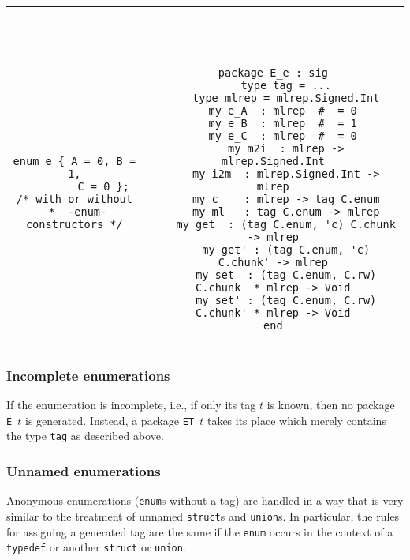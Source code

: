 \begin{small}
\begin{center}
\begin{tabular}{c|c}
\begin{minipage}{4in}
\begin{verbatim}
\end{verbatim}
\end{minipage}
\\ \hline
\begin{minipage}{2in}
\begin{verbatim}
enum e { A = 0, B = 1,
         C = 0 };
/* with or without
 *  -enum-constructors */
\end{verbatim}
\end{minipage}
&
\begin{minipage}{4in}
\begin{verbatim}

package E_e : sig
    type tag = ...
    type mlrep = mlrep.Signed.Int
    my e_A  : mlrep  #  = 0 
    my e_B  : mlrep  #  = 1 
    my e_C  : mlrep  #  = 0 
    my m2i  : mlrep -> mlrep.Signed.Int
    my i2m  : mlrep.Signed.Int -> mlrep
    my c    : mlrep -> tag C.enum
    my ml   : tag C.enum -> mlrep
    my get  : (tag C.enum, 'c) C.chunk  -> mlrep
    my get' : (tag C.enum, 'c) C.chunk' -> mlrep
    my set  : (tag C.enum, C.rw) C.chunk  * mlrep -> Void
    my set' : (tag C.enum, C.rw) C.chunk' * mlrep -> Void
end

\end{verbatim}
\end{minipage}
\end{tabular}
\end{center}
\end{small}


\subsubsection*{Incomplete enumerations}

If the enumeration is incomplete, i.e., if only its tag $t$ is known,
then no package {\tt E\_$t$} is generated.  Instead, a package
{\tt ET\_$t$} takes its place which merely contains the type {\tt tag}
as described above.

\subsubsection*{Unnamed enumerations}

Anonymous enumerations ({\tt enum}s without a tag) are handled in a
way that is very similar to the treatment of unnamed {\tt struct}s and
{\tt union}s.  In particular, the rules for assigning a generated tag
are the same if the {\tt enum} occurs in the context of a {\tt
  typedef} or another {\tt struct} or {\tt union}.

